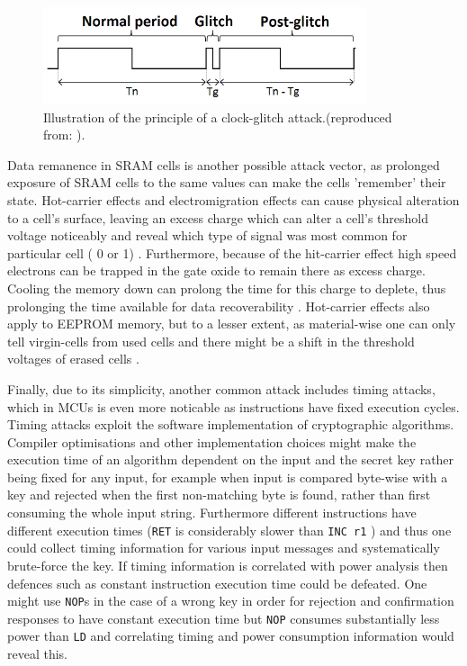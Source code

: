 	\begin{figure}
		\center
		\includegraphics[scale=0.7]{img/clock_glitch.png}
		\caption{\footnotesize Illustration of the principle of a clock-glitch attack.(reproduced from: \protect\citep{glitches_paper}).}
		\label{fig:glitch}		
	\end{figure}

	Data remanence in SRAM cells is another possible attack vector, as prolonged exposure of SRAM cells to the same values can make the cells 'remember' their state. Hot-carrier effects and electromigration effects can cause physical alteration to a cell's surface, leaving an excess charge which can alter a cell's threshold voltage noticeably and reveal which type of signal was most common for particular cell ( 0 or 1) \citep{gutman:memory_remanence}. Furthermore, because of the hit-carrier effect high speed electrons can be trapped in the gate oxide to remain there as excess charge. Cooling the memory down can prolong the time for this charge to deplete, thus prolonging the time available for data recoverability  \citep{gutman:memory_remanence} \citep{sergei:RAM} \citep{sergei:thesis}. Hot-carrier effects also apply to EEPROM memory, but to a lesser extent, as material-wise one can only tell virgin-cells from used cells and there might be a shift in the threshold voltages of erased cells\citep{gutman:memory_remanence} \citep{sergei:thesis}. 
	
	
	Finally, due to its simplicity, another common attack includes timing attacks, which in MCUs is even more noticable as instructions have fixed execution cycles. Timing attacks exploit the software implementation of cryptographic algorithms. Compiler optimisations and other implementation choices might make the execution time of an algorithm dependent on the input and the secret key rather being fixed for any input, for example when input is compared byte-wise with a key and rejected when the first non-matching byte is found, rather than first consuming the whole input string. Furthermore different instructions have different execution times (\texttt{RET} is considerably slower than \texttt{INC r1} \citep{atmega_manual}) and thus one could collect timing information for various input messages and systematically brute-force the key. If timing information is correlated with power analysis then defences such as constant instruction execution time could be defeated. One might use \texttt{NOP}s in the case of a wrong key in order for rejection and confirmation responses to have constant execution time but \texttt{NOP} consumes substantially less power than \texttt{LD} \citep{glitches_paper} and correlating timing and power consumption information would reveal this.

